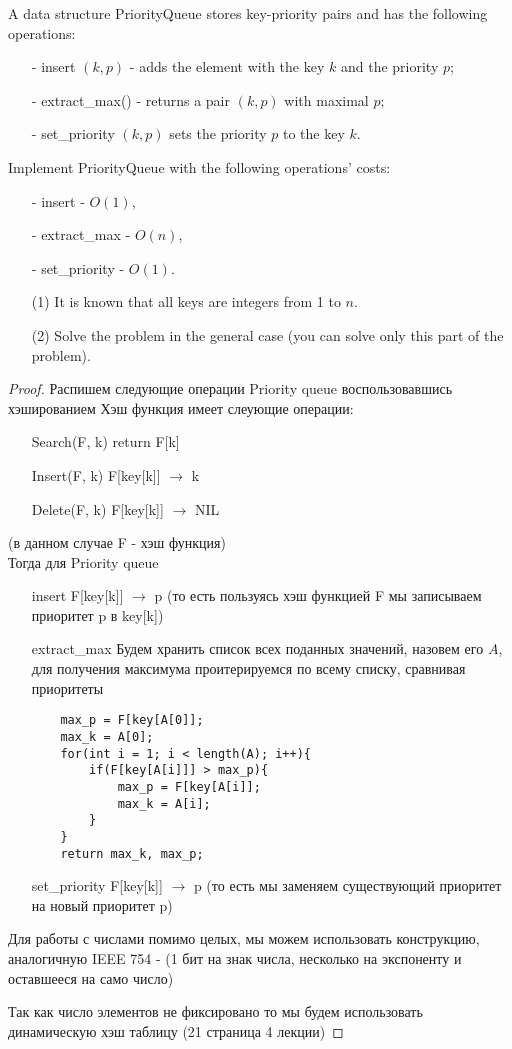 \begin{prob}
A data structure PriorityQueue stores key-priority pairs and has the following operations:
\begin{itemize}
\item[-] insert $(k, p)$ - adds the element with the key $k$ and the priority $p$;
\item[-] extract\_max() - returns a pair $(k, p)$ with maximal $p$;
\item[-] set\_priority $(k, p)$ sets the priority $p$ to the key $k$.
\end{itemize}
Implement PriorityQueue with the following operations' costs:
\begin{itemize}
\item[-] insert - $O(1)$,
\item[-] extract\_max - $O(n)$,
\item[-] set\_priority - $O(1)$.
\item[]
\item[(1)] It is known that all keys are integers from 1 to $n$.
\item[(2)] Solve the problem in the general case (you can solve only this part of the problem).
\end{itemize}
\end{prob}
\vskip 0.2in
\begin{proof}
Распишем следующие операции Priority queue воспользовавшись хэшированием
Хэш функция имеет слеующие операции:
\begin{itemize}
\item[Search(F, k)] return F[k]
\item[Insert(F, k)] F[key[k]] $\rightarrow$ k
\item[Delete(F, k)] F[key[k]] $\rightarrow$ NIL
\end{itemize}
(в данном случае F - хэш функция)\\
Тогда для Priority queue
\begin{itemize}
\item[insert] F[key[k]] $\rightarrow$ p (то есть пользуясь хэш функцией F мы записываем приоритет p в key[k])
\item[extract\_max] Будем хранить список всех поданных значений, назовем его $A$, для получения максимума проитерируемся по всему списку, сравнивая приоритеты
    \begin{lstlisting}
    max_p = F[key[A[0]];
    max_k = A[0];
    for(int i = 1; i < length(A); i++){
        if(F[key[A[i]]] > max_p){
            max_p = F[key[A[i]];
            max_k = A[i];
        }
    }
    return max_k, max_p; 
    \end{lstlisting}
\item[set\_priority] F[key[k]] $\rightarrow$ p (то есть мы заменяем существующий приоритет на новый приоритет p)
\end{itemize}
Для работы с числами помимо целых, мы можем использовать конструкцию, аналогичную IEEE 754 - (1 бит на знак числа, несколько на экспоненту и оставшееся на само число)

Так как число элементов не фиксировано то мы будем использовать динамическую хэш таблицу (21 страница 4 лекции)
\end{proof}
\vskip 0.6in




